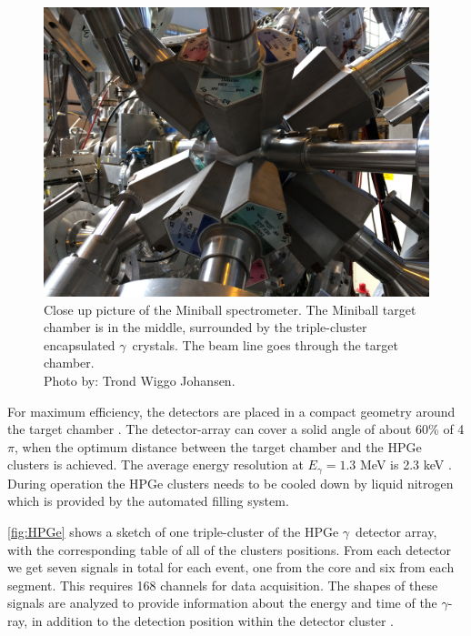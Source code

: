 \documentclass[twoside,english]{uiofysmaster/uiofysmaster}
\newcommand{\ga}{$\gamma$}
\let\orgautoref\autoref
\renewcommand{\autoref}
        {%
		 \def\sectionautorefname{Section}%
		 \def\subsectionautorefname{Section}%
		 \def\subsubsectionautorefname{Section}%
		 \def\chapterautorefname{Chapter}%
          \orgautoref}
\begin{document}
\begin{figure}[ht]
	\centering
	\includegraphics[width=\linewidth]{Images/IMG3917.JPG}
	\caption{Close up picture of the Miniball spectrometer. The Miniball target chamber is in the middle, surrounded by the triple-cluster encapsulated \ga\ crystals. The beam line goes through the target chamber. \\ Photo by: Trond Wiggo Johansen.}
	\label{fig:MBSpectCU}
\end{figure}

For maximum efficiency, the detectors are placed in a compact geometry around the target chamber \cite{NWarr-HPGe, MB-spect}. 
The detector-array can cover a solid angle of about 60\% of 4$\pi$, when the optimum distance between the target chamber and the HPGe clusters is achieved. 
The average energy resolution at $E_\gamma = 1.3$ MeV is 2.3 keV \cite{Butler2017}. 
During operation the HPGe clusters needs to be cooled down by liquid nitrogen which is provided by the automated filling system. 

\autoref{fig:HPGe} shows a sketch of one triple-cluster of the HPGe \ga\ detector array, with the corresponding table of all of the clusters positions.
From each detector we get seven signals in total for each event, one from the core and six from each segment. 
This requires 168 channels for data acquisition. 
The shapes of these signals are analyzed to provide information about the energy and time of the \ga-ray, in addition to the detection position within the detector cluster \cite{NWarr-HPGe}.
\end{document}
